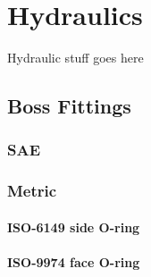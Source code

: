 \chapter{Hydraulics}
Hydraulic stuff goes here
\section{Boss Fittings}
\subsection{SAE}
\subsection{Metric}
\subsubsection{ISO-6149 side O-ring}
\subsubsection{ISO-9974 face O-ring}
